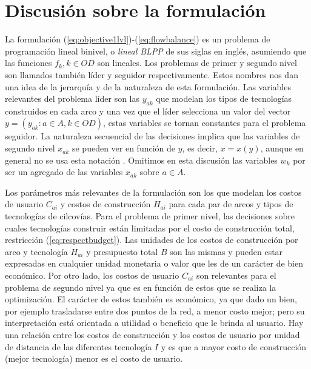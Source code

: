 \section*{Discusión sobre la formulación}

La formulación (\ref{eq:objective1lvl})-(\ref{eq:flowbalance}) es un problema de programación lineal binivel, o {\it lineal BLPP} de sus siglas en inglés, asumiendo que las funciones $f_k, k\in OD$ son lineales. Los problemas de primer y segundo nivel son llamados también líder y seguidor respectivamente. Estos nombres nos dan una idea de la jerarquía y de la naturaleza de esta formulación. Las variables relevantes del problema líder son las $y_{ak}$ que modelan los tipos de tecnologías construidos en cada arco y una vez que el líder selecciona un valor del vector $y = \left( y_{ak}: a \in A, k \in OD \right)$, estas variables se tornan constantes para el problema seguidor. La naturaleza secuencial de las decisiones implica que las variables de segundo nivel $x_{ak}$ se pueden ver en función de $y$, es decir, $x = x(y)$, aunque en general no se usa esta notación \parencite{bardbook}. Omitimos en esta discusión las variables $w_k$ por ser un agregado de las variables $x_{ak}$ sobre $a \in A$.


Los parámetros más relevantes de la formulación son los que modelan los costos de usuario $C_{ai}$ y costos de construcción $H_{ai}$ para cada par de arcos y tipos de tecnologías de cilcovías. Para el problema de primer nivel, las decisiones sobre cuales tecnologías construir están limitadas por el costo de construcción total, restricción (\ref{eq:respectbudget}). Las unidades de los costos de construcción por arco y tecnología $H_{ai}$ y presupuesto total $B$ son las mismas y pueden estar expresadas en cualquier unidad monetaria o valor que les de un carácter de bien económico. Por otro lado, los costos de usuario $C_{ai}$ son relevantes para el problema de segundo nivel ya que es en función de estos que se realiza la optimización. El carácter de estos también es económico, ya que dado un bien, por ejemplo trasladarse entre dos puntos de la red, a menor costo mejor; pero su interpretación está orientada a utilidad o beneficio que le brinda al usuario. Hay una relación entre los costos de construcción y los costos de usuario por unidad de distancia de las diferentes tecnología $I$ y es que a mayor costo de construcción (mejor tecnología) menor es el costo de usuario.

